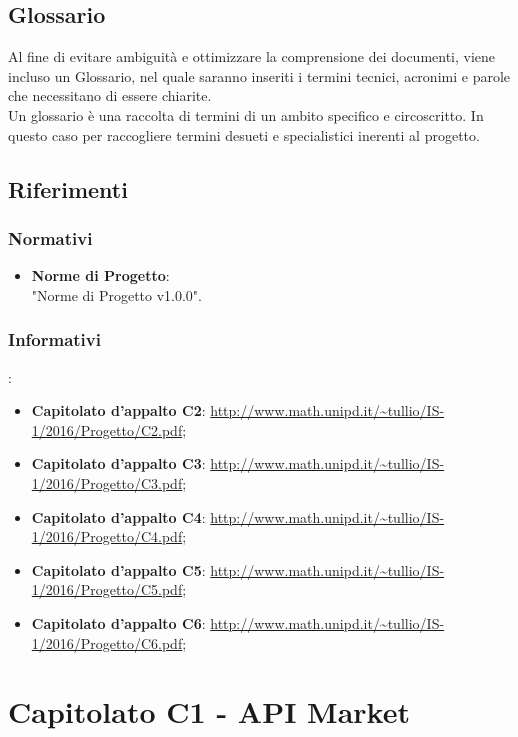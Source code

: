 \documentclass[12pt,a4paper,titlepage]{article}
\begin{document}
\subsection{Glossario}
Al fine di evitare ambiguità e ottimizzare la comprensione dei documenti, viene incluso un Glossario, nel quale saranno inseriti i termini tecnici, acronimi e parole che necessitano di essere chiarite.\\
Un glossario è una raccolta di termini di un ambito specifico e circoscritto. In questo caso per raccogliere termini desueti e specialistici inerenti al progetto. 

\subsection{Riferimenti}
\subsubsection{Normativi}
\begin{itemize}
	\item \textbf{Norme di Progetto}: \\
	"Norme di Progetto v1.0.0".
\end{itemize}
\subsubsection{Informativi}:	
\begin{itemize}
	\item \textbf{Capitolato d'appalto C2}: \textcolor{blue}{\url{http://www.math.unipd.it/~tullio/IS-1/2016/Progetto/C2.pdf}};
	\item \textbf{Capitolato d'appalto C3}: \textcolor{blue}{\url{http://www.math.unipd.it/~tullio/IS-1/2016/Progetto/C3.pdf}}; 
	\item \textbf{Capitolato d'appalto C4}: \textcolor{blue}{\url{http://www.math.unipd.it/~tullio/IS-1/2016/Progetto/C4.pdf}}; 
	\item \textbf{Capitolato d'appalto C5}: \textcolor{blue}{\url{http://www.math.unipd.it/~tullio/IS-1/2016/Progetto/C5.pdf}}; 
	\item \textbf{Capitolato d'appalto C6}: \textcolor{blue}{\url{http://www.math.unipd.it/~tullio/IS-1/2016/Progetto/C6.pdf}}; 
\end{itemize} 

\newpage

\section{Capitolato C1 - API Market}
\end{document}
